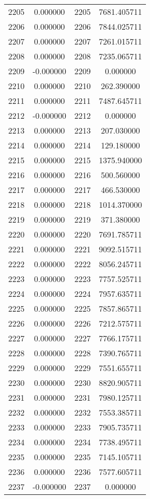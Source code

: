 \documentclass[12pt]{article}
\begin{document}
\begin{longtable}{@{}cccc@{}}
2205 & 0.000000 & 2205 & 7681.405711 \\
2206 & 0.000000 & 2206 & 7844.025711 \\
2207 & 0.000000 & 2207 & 7261.015711 \\
2208 & 0.000000 & 2208 & 7235.065711 \\
2209 & -0.000000 & 2209 & 0.000000 \\
2210 & 0.000000 & 2210 & 262.390000 \\
2211 & 0.000000 & 2211 & 7487.645711 \\
2212 & -0.000000 & 2212 & 0.000000 \\
2213 & 0.000000 & 2213 & 207.030000 \\
2214 & 0.000000 & 2214 & 129.180000 \\
2215 & 0.000000 & 2215 & 1375.940000 \\
2216 & 0.000000 & 2216 & 500.560000 \\
2217 & 0.000000 & 2217 & 466.530000 \\
2218 & 0.000000 & 2218 & 1014.370000 \\
2219 & 0.000000 & 2219 & 371.380000 \\
2220 & 0.000000 & 2220 & 7691.785711 \\
2221 & 0.000000 & 2221 & 9092.515711 \\
2222 & 0.000000 & 2222 & 8056.245711 \\
2223 & 0.000000 & 2223 & 7757.525711 \\
2224 & 0.000000 & 2224 & 7957.635711 \\
2225 & 0.000000 & 2225 & 7857.865711 \\
2226 & 0.000000 & 2226 & 7212.575711 \\
2227 & 0.000000 & 2227 & 7766.175711 \\
2228 & 0.000000 & 2228 & 7390.765711 \\
2229 & 0.000000 & 2229 & 7551.655711 \\
2230 & 0.000000 & 2230 & 8820.905711 \\
2231 & 0.000000 & 2231 & 7980.125711 \\
2232 & 0.000000 & 2232 & 7553.385711 \\
2233 & 0.000000 & 2233 & 7905.735711 \\
2234 & 0.000000 & 2234 & 7738.495711 \\
2235 & 0.000000 & 2235 & 7145.105711 \\
2236 & 0.000000 & 2236 & 7577.605711 \\
2237 & -0.000000 & 2237 & 0.000000 \\

\end{longtable}
\end{document}
